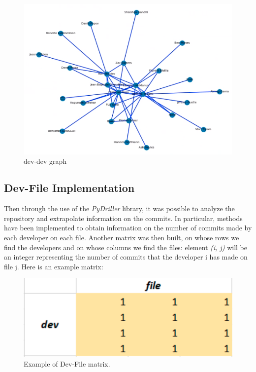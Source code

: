 \documentclass[sigconf]{acmart}
\begin{document}
\begin{figure}[h]
  \centering
  \includegraphics[width=\linewidth]{img_8.1}
  \caption{dev-dev graph}
  \Description{}
\end{figure}

\subsection{Dev-File Implementation}
Then through the use of the {\itshape PyDriller} library, it was possible to analyze the repository and extrapolate information on the commits. In particular, methods have been implemented to obtain information on the number of commits made by each developer on each file.
Another matrix was then built, on whose rows we find the developers and on whose columns we find the files: element {\itshape (i, j)} will be an integer representing the number of commits that the developer i has made on file j. Here is an example matrix:

\begin{figure}[h]
  \centering
  \includegraphics[width=\linewidth]{img_3}
  \caption{Example of Dev-File matrix.}
  \Description{}
\end{figure}
\end{document}

